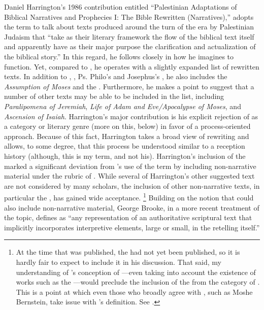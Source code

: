 Daniel Harrington's 1986 contribution entitled ``Palestinian Adaptations of Biblical Narratives and Prophecies I: The Bible Rewritten (Narratives),'' adopts the term \rwb to talk about texts produced around the turn of the era by Palestinian Judaism that ``take as their literary framework the flow of the biblical text itself and apparently have as their major purpose the clarification and actualization of the biblical story.''%
    \autocite[239]{harrington_kraft-nickelsburg1986}
In this regard, he follows \vermes closely in how he imagines \rwb to function. Yet, compared to \vermes, he operates with a slightly expanded list of rewritten texts. In addition to \jub, \ga, Ps. Philo's \lab and Josephus's \ant, he also includes the \emph{Assumption of Moses} and the \templescroll. Furthermore, he makes a point to suggest that a number of other texts may be able to be included in the list, including \emph{Paralipomena of Jeremiah}, \emph{Life of Adam and Eve/Apocalypse of Moses}, and \emph{Ascension of Isaiah}. Harrington's major contribution is his explicit rejection of \rwb as a category or literary genre (more on this, below) in favor of a process-oriented approach. Because of this fact, Harrington takes a broad view of rewriting and allows, to some degree, that this process be understood similar to a reception history (although, this is my term, and not his). Harrington's inclusion of the \templescroll marked a significant deviation from \vermes's use of the term by including non-narrative material under the rubric of \rwb. While several of Harrington's other suggested text are not considered \rwb by many scholars, the inclusion of other non-narrative texts, in particular the \templescroll, has gained wide acceptance.%
    \footnote{At the time that  was published, the \templescroll had not yet been published, so it is hardly fair to expect \vermes to include it in his discussion. That said, my understanding of \vermes's conception of \rwb---even taking into account the existence of works such as the \templescroll---would preclude the inclusion of the \templescroll from the category of \rwb. This is a point at which even those who broadly agree with \vermes, such as Moshe Bernstein, take issue with \vermes's definition. See \cite[183--184]{bernstein_textus2005}.}
%
Building on the notion that \rwb could also include non-narrative material, George Brooke, in a more recent treatment of the topic, defines \rwb as ``any representation of an authoritative scriptural text that implicitly incorporates interpretive elements, large or small, in the retelling itself.''%
